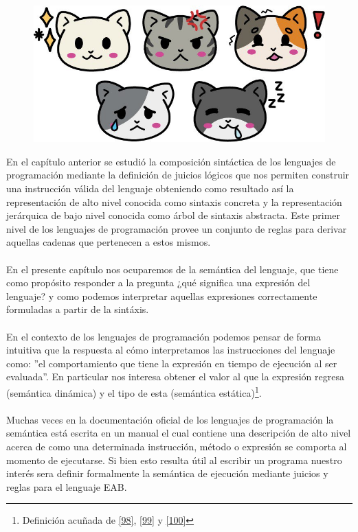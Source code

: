 
\begin{figure}[htbp]
    \centerline{\includegraphics[scale=.4]{assets/04_gatito_semantica.jpg}}       
\end{figure}


\bigskip
\bigskip
\bigskip
\bigskip


    En el capítulo anterior se estudió la composición sintáctica de los lenguajes de programación mediante la definición de juicios lógicos que nos permiten construir una instrucción válida del lenguaje obteniendo como resultado así la representación de alto nivel conocida como sintaxis 
    concreta y la representación jerárquica de bajo nivel conocida como árbol de sintaxis abstracta. Este primer nivel de los lenguajes de programación provee un conjunto de reglas para derivar aquellas cadenas que pertenecen a estos mismos.\\\\
    En el presente capítulo nos ocuparemos de la semántica del lenguaje, que tiene como propósito responder a la pregunta ¿qué significa una expresión del lenguaje? y como podemos interpretar aquellas expresiones correctamente formuladas a partir de la sintáxis.\\\\
    En el contexto de los lenguajes de programación podemos pensar de forma intuitiva que la respuesta al cómo interpretamos las instrucciones del lenguaje como: ''el comportamiento que tiene la expresión en tiempo de ejecución al ser evaluada''. 
    En particular  nos interesa obtener el valor al que la expresión regresa (semántica dinámica) y el tipo de esta (semántica estática)\footnote{Definición acuñada de \hyperlink{98}{[98]}, \hyperlink{99}{[99]} y \hyperlink{100}{[100]}}.\\\\
    Muchas veces en la documentación oficial de los lenguajes de programación la semántica está escrita en un manual el cual contiene una descripción de alto nivel
    acerca de como una determinada instrucción, método o expresión se comporta al momento de ejecutarse. Si bien esto resulta útil al escribir un programa nuestro interés sera definir formalmente la semántica de ejecución mediante juicios y reglas para el lenguaje \textsf{EAB}. \\

